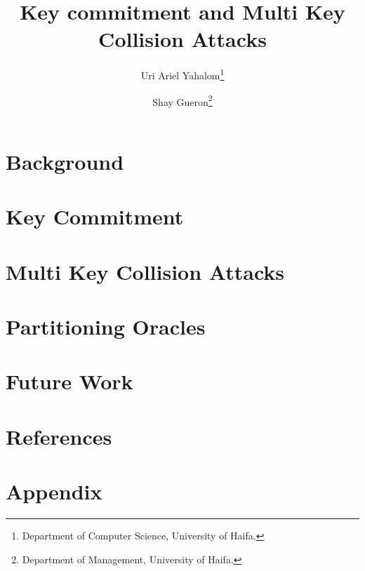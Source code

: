 \documentclass[12pt]{article}
\title{Key commitment and Multi Key Collision Attacks}
\author{Uri Ariel Yahalom\thanks{Department of Computer Science, University of Haifa.}
\and Shay Gueron\thanks{Department of Management, University of Haifa.}}
\date{}
\begin{document}
    
    \newpage


    \section{Background}\label{sec:background}
    
    \newpage


    \section{Key Commitment}\label{sec:key-commitment}
    
    \newpage


    \section{Multi Key Collision Attacks}\label{sec:multi-key-collision-attacks}
    
    \newpage


    \section{Partitioning Oracles}\label{sec:partitioning-oracles}
    
    \newpage


    \section*{Future Work}
    
    \newpage


    \section*{References}
    
    
    \newpage


    \section*{Appendix}
    
    \newpage
\end{document}
